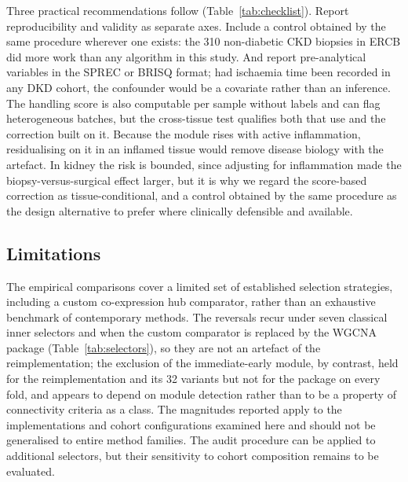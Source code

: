 \documentclass[unnumsec,webpdf,contemporary,large,numbered]{oup-authoring-template}
\begin{document}
Three practical recommendations follow (Table~\ref{tab:checklist}). Report reproducibility and
validity as separate axes. Include a control obtained by the same procedure wherever one exists:
the 310 non-diabetic CKD biopsies in ERCB did more work than any algorithm in this study. And
report pre-analytical variables in the SPREC \cite{betsou2010,lehmann2012} or BRISQ
\cite{moore2011} format; had ischaemia time been recorded in any DKD cohort, the confounder would
be a covariate rather than an inference. The handling score is also computable per sample without
labels and can flag heterogeneous batches, but the cross-tissue test qualifies both that use and
the correction built on it. Because the module rises with active inflammation, residualising on
it in an inflamed tissue would remove disease biology with the artefact. In kidney the risk is
bounded, since adjusting for inflammation made the biopsy-versus-surgical effect larger, but it is
why we regard the score-based correction as tissue-conditional, and a control obtained by the
same procedure as the design alternative to prefer where clinically defensible and available.

\subsection{Limitations}\label{sec:limitations}

The empirical comparisons cover a limited set of established selection strategies,
including a custom co-expression hub comparator, rather than an exhaustive benchmark of
contemporary methods. The reversals recur under seven classical inner selectors and when the custom comparator is
replaced by the WGCNA package (Table~\ref{tab:selectors}), so they are not an artefact of the
reimplementation; the exclusion of the immediate-early module, by contrast, held for the
reimplementation and its 32 variants but not for the package on every fold, and appears to depend
on module detection rather than to be a property of connectivity criteria as a class. The magnitudes
reported apply to the implementations and cohort configurations examined here and should not be
generalised to entire method families. The audit procedure can be applied to additional selectors, but their sensitivity
to cohort composition remains to be evaluated.
\end{document}
